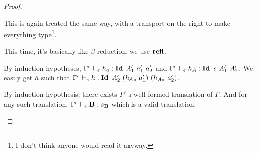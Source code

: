 \documentclass[a4paper,english]{lipics-utf8x}
\begin{document}
\begin{proof}
\begin{caselist}
      \begin{graycase}
        \begin{mathc}
        \end{mathc}
        This is again treated the same way, with a transport on the right to
        make everything
        type\footnote{I don't think anyone would read it anyway.}.
      \end{graycase}

      \begin{graycase}
        \begin{mathc}
        \end{mathc}
        This time, it's basically like $\beta$-reduction, we use $\operatorname{\mathbf{refl}}$.
      \end{graycase}

      \begin{graycase}
        \begin{mathc}
        \end{mathc}
        By induction hypotheses, $\Gamma' \,\vdash_e h_a : \operatorname{\mathbf{Id}~} A'_1\ a'_1\ a'_2$
        and $\Gamma' \,\vdash_e h_A : \operatorname{\mathbf{Id}~} s\ A'_1\ A'_2$.
        We easily get $h$ such that $\Gamma' \dere h : \Id A'_2\ %
        ({h_A}_*\ a'_1)\ ({h_A}_*\ a'_2)$.
      \end{graycase}

      \nextcase
      \begin{mathc}
        \ru{\derr \Gamma
          }{\Gamma \derr \mR : \sB}
      \end{mathc}
      By induction hypothesis, there exists $\Gamma'$ a well-formed translation
      of $\Gamma$. And for any such translation, $\Gamma' \,\vdash_e \operatorname{\mathbf{B}} : s_{\operatorname{\mathbf{B}}}$
      which is a valid translation.


\end{caselist}
\end{proof}
\end{document}
